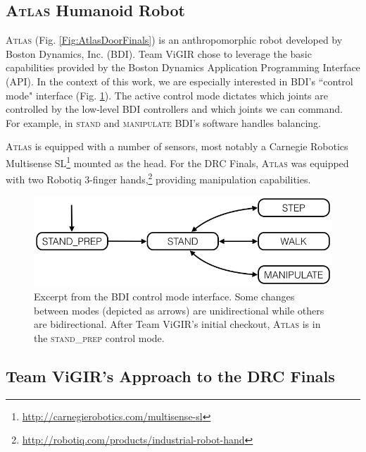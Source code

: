 
\subsection{\textsc{Atlas} Humanoid Robot}

\textsc{Atlas} (Fig. \ref{Fig:AtlasDoorFinals}) is an anthropomorphic robot developed by Boston Dynamics, Inc. (BDI). 
Team ViGIR chose to leverage the basic capabilities provided by the Boston Dynamics Application Programming Interface (API).
In the context of this work, we are especially interested in BDI's ``control mode" interface (Fig. \ref{Fig:ControlModeTS}).
The active control mode dictates which joints are controlled by the low-level BDI controllers and which joints we can command.
For example, in \textsc{stand} and \textsc{manipulate} BDI's software handles balancing.

\textsc{Atlas} is equipped with a number of sensors, most notably a Carnegie Robotics Multisense SL\footnote{\scriptsize{\url{http://carnegierobotics.com/multisense-sl}}} mounted as the head.
For the DRC Finals, \textsc{Atlas} was equipped with two Robotiq 3-finger hands,\footnote{\scriptsize{\url{http://robotiq.com/products/industrial-robot-hand}}} providing manipulation capabilities.

\begin{figure}[t]
\centering
\includegraphics[width=0.99\columnwidth,clip]{./img/control_modes_ts.png}
\caption{Excerpt from the BDI control mode interface.
Some changes between modes (depicted as arrows) are unidirectional while others are bidirectional.
After Team ViGIR's initial checkout, \textsc{Atlas} is in the \textsc{stand\_prep} control mode.
}
\label{Fig:ControlModeTS}
\end{figure}

\subsection{Team ViGIR's Approach to the DRC Finals}

